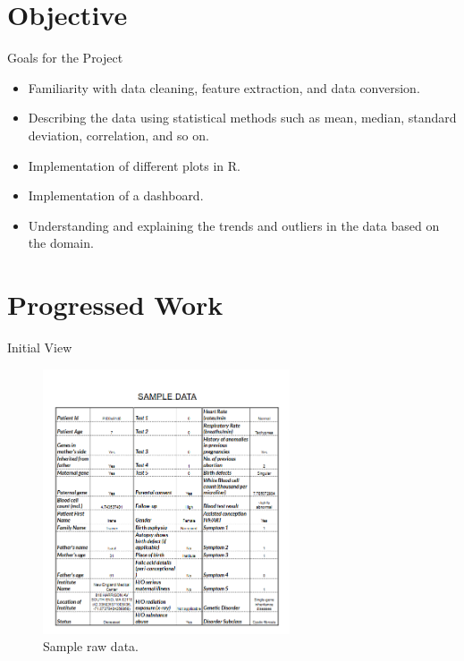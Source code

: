 \documentclass{beamer}
\begin{document}
	\section{Objective}
	\begin{frame}{Goals for the Project}
		\begin{itemize}
			\item Familiarity with data cleaning, feature extraction, and data conversion.
			
			\item Describing the data using statistical methods such as mean, median, standard deviation, correlation, and so on.
			
			\item Implementation of different plots in R.
			
			\item Implementation of a dashboard.
			
			\item Understanding and explaining the trends and outliers in the data based on the domain.
		\end{itemize}
	\end{frame}
	
	\section{Progressed Work}
	\begin{frame}{Initial View}
		\begin{figure}
			\includegraphics[width=0.65\textwidth, height=0.72\textheight]{sample.png}
			\caption{Sample raw data.}
		\end{figure}
	\end{frame}
	
\end{document}
